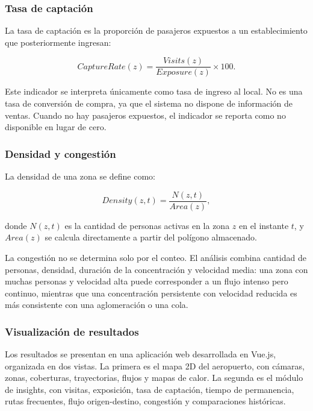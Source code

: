 \documentclass[12pt,letterpaper]{article}
\begin{document}
\subsubsection{Tasa de captación}

La tasa de captación es la proporción de pasajeros expuestos a un
establecimiento que posteriormente ingresan:

\begin{equation}
CaptureRate(z)=
\frac{Visits(z)}
{Exposure(z)}
\times100.
\end{equation}

Este indicador se interpreta únicamente como tasa de ingreso al local. No
es una tasa de conversión de compra, ya que el sistema no dispone de
información de ventas. Cuando no hay pasajeros expuestos, el indicador
se reporta como no disponible en lugar de cero.

\subsubsection{Densidad y congestión}

La densidad de una zona se define como:

\begin{equation}
Density(z,t)=
\frac{N(z,t)}
{Area(z)},
\end{equation}

donde $N(z,t)$ es la cantidad de personas activas en la zona $z$ en el
instante $t$, y $Area(z)$ se calcula directamente a partir del polígono
almacenado.

La congestión no se determina solo por el conteo. El análisis combina
cantidad de personas, densidad, duración de la concentración y velocidad
media: una zona con muchas personas y velocidad alta puede corresponder a
un flujo intenso pero continuo, mientras que una concentración
persistente con velocidad reducida es más consistente con una
aglomeración o una cola.

\subsubsection{Visualización de resultados}

Los resultados se presentan en una aplicación web desarrollada en
Vue.js, organizada en dos vistas. La primera es el mapa 2D del
aeropuerto, con cámaras, zonas, coberturas, trayectorias, flujos y mapas
de calor. La segunda es el módulo de insights, con visitas, exposición,
tasa de captación, tiempo de permanencia, rutas frecuentes, flujo
origen-destino, congestión y comparaciones históricas.
\end{document}
